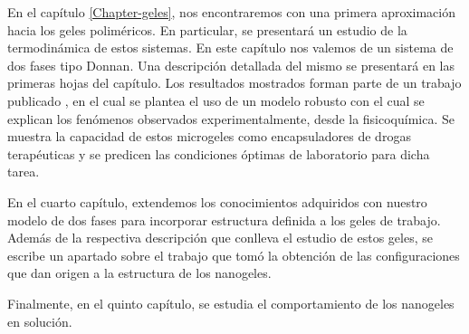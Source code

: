 En el cap\'itulo \ref{Chapter-geles}, nos encontraremos con una primera aproximaci\'on hacia los geles polim\'ericos. En particular, se presentará un estudio de la termodin\'amica de estos sistemas. En este cap\'itulo nos valemos de un sistema de dos fases tipo Donnan. Una descripci\'on detallada del mismo se presentar\'a en las primeras hojas del cap\'itulo. Los resultados mostrados forman parte de un trabajo publicado \cite{perez2021thermodynamic}, en el cual se plantea el uso de un modelo robusto con el cual se explican los fen\'omenos observados experimentalmente, desde la fisicoqu\'imica. Se muestra la capacidad de estos microgeles como encapsuladores de drogas terap\'euticas y se predicen las condiciones \'optimas de laboratorio para dicha tarea.

En el cuarto cap\'itulo, extendemos los conocimientos adquiridos con nuestro modelo de dos fases para incorporar estructura definida a los geles de trabajo. Adem\'as de la respectiva descripci\'on que conlleva el estudio de estos geles, se escribe un apartado sobre el trabajo que tom\'o la obtenci\'on de las configuraciones que dan origen a la estructura de los nanogeles.

Finalmente, en el quinto cap\'itulo, se estudia el comportamiento de los nanogeles en soluci\'on.


